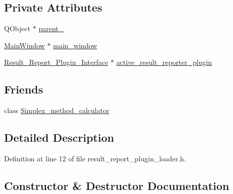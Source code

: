 \subsection*{Private Attributes}
\begin{DoxyCompactItemize}
\item 
Q\+Object $\ast$ \hyperlink{classResult__Report__plugin__Loader_ab0e4927a2b20aa0a8e65f15985ba1e7d}{parent\+\_\+}
\item 
\hyperlink{classMainWindow}{Main\+Window} $\ast$ \hyperlink{classResult__Report__plugin__Loader_ae667e888c4dcfb9e086a7187b6acf195}{main\+\_\+window}
\item 
\hyperlink{classResult__Report__Plugin__Interface}{Result\+\_\+\+Report\+\_\+\+Plugin\+\_\+\+Interface} $\ast$ \hyperlink{classResult__Report__plugin__Loader_aaee504ed6666a619a044ac4d397db20e}{active\+\_\+result\+\_\+reporter\+\_\+plugin}
\end{DoxyCompactItemize}
\subsection*{Friends}
\begin{DoxyCompactItemize}
\item 
class \hyperlink{classResult__Report__plugin__Loader_aa57bcac61e09f9c999a2f048dc923409}{Simplex\+\_\+method\+\_\+calculator}
\end{DoxyCompactItemize}


\subsection{Detailed Description}


Definition at line 12 of file result\+\_\+report\+\_\+plugin\+\_\+loader.\+h.



\subsection{Constructor \& Destructor Documentation}
\mbox{\label{classResult__Report__plugin__Loader_a6276745d1351cafa6ba2a08e1909240c}} 
